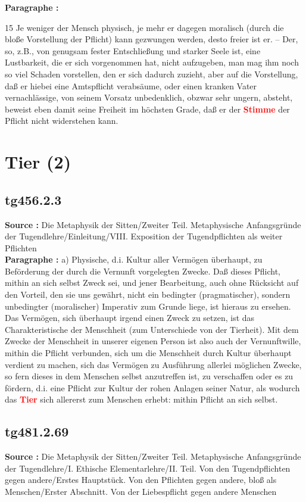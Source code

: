 \documentclass[a4paper,12pt,twoside]{book}
\newcommand{\match}[1]{\textcolor{red}{\textbf{#1}}}
\newcommand{\unnumberedsection}[1]{
	\section*{#1}
	\addcontentsline{toc}{section}{#1}
	\markright{#1}
}
\begin{document}
	\textbf{Paragraphe : }
	
	15 Je weniger der Mensch physisch, je mehr er dagegen moralisch (durch die bloße Vorstellung der Pflicht) kann gezwungen werden, desto freier ist er. – Der, so, z.B., von genugsam fester Entschließung und starker Seele ist, eine Lustbarkeit, die er sich vorgenommen hat, nicht aufzugeben, man mag ihm noch so viel Schaden vorstellen, den er sich dadurch zuzieht, aber auf die Vorstellung, daß er hiebei eine Amtspflicht verabsäume, oder einen kranken Vater vernachlässige, von seinem Vorsatz unbedenklich, obzwar sehr ungern, absteht, beweist eben damit seine Freiheit im höchsten Grade, daß er der \match{Stimme} der Pflicht nicht widerstehen kann. 
	
	\unnumberedsection{Tier (2)} 
	\subsection*{tg456.2.3} 
	\textbf{Source : }Die Metaphysik der Sitten/Zweiter Teil. Metaphysische Anfangsgründe der Tugendlehre/Einleitung/VIII. Exposition der Tugendpflichten als weiter Pflichten\\  
	
	\textbf{Paragraphe : }a) Physische, d.i. Kultur aller Vermögen überhaupt, zu Beförderung der durch die Vernunft vorgelegten Zwecke. Daß dieses Pflicht, mithin an sich selbst Zweck sei, und jener Bearbeitung, auch ohne Rücksicht auf den Vorteil, den sie uns gewährt, nicht ein bedingter (pragmatischer), sondern unbedingter (moralischer) Imperativ zum Grunde liege, ist hieraus zu ersehen. Das Vermögen, sich überhaupt irgend einen Zweck zu setzen, ist das Charakteristische der Menschheit (zum Unterschiede von der Tierheit). Mit dem Zwecke der Menschheit in unserer eigenen Person ist also auch der Vernunftwille, mithin die Pflicht verbunden, sich um die Menschheit durch Kultur überhaupt verdient zu machen, sich das Vermögen zu Ausführung allerlei möglichen Zwecke, so fern dieses in dem Menschen selbst anzutreffen ist, zu verschaffen oder es zu fördern, d.i. eine Pflicht zur Kultur der rohen Anlagen seiner Natur, als wodurch das \match{Tier} sich allererst zum Menschen erhebt: mithin Pflicht an sich selbst. 
	
	\subsection*{tg481.2.69} 
	\textbf{Source : }Die Metaphysik der Sitten/Zweiter Teil. Metaphysische Anfangsgründe der Tugendlehre/I. Ethische Elementarlehre/II. Teil. Von den Tugendpflichten gegen andere/Erstes Hauptstück. Von den Pflichten gegen andere, bloß als Menschen/Erster Abschnitt. Von der Liebespflicht gegen andere Menschen\\  
	
\end{document}
